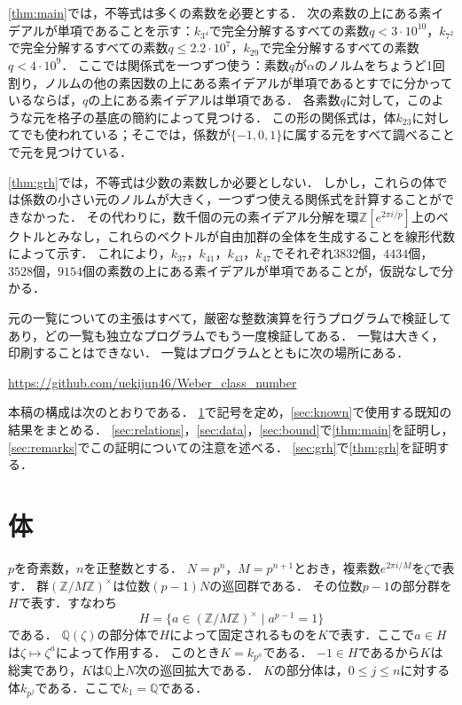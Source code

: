 \documentclass[11pt,a4paper]{ltjsarticle}
\theoremstyle{ja}
\begin{document}
\cref{thm:main}では，不等式は多くの素数を必要とする．
次の素数の上にある素イデアルが単項であることを示す：$k_{3^4}$で完全分解するすべての素数$q < 3 \cdot 10^{10}$，$k_{7^2}$で完全分解するすべての素数$q \le 2.2 \cdot 10^7$，$k_{29}$で完全分解するすべての素数$q < 4 \cdot 10^9$．
ここでは関係式を一つずつ使う：素数$q$が$\alpha$のノルムをちょうど1回割り，ノルムの他の素因数の上にある素イデアルが単項であるとすでに分かっているならば，$q$の上にある素イデアルは単項である．
各素数$q$に対して，このような元を格子の基底の簡約によって見つける．
この形の関係式は，体$k_{23}$に対して\cite{Ch26}でも使われている；そこでは，係数が$\{-1, 0, 1\}$に属する元をすべて調べることで元を見つけている．

\cref{thm:grh}では，不等式は少数の素数しか必要としない．
しかし，これらの体では係数の小さい元のノルムが大きく，一つずつ使える関係式を計算することができなかった．
その代わりに，数千個の元の素イデアル分解を環$\mathbb{Z}[e^{2\pi i/p}]$上のベクトルとみなし，これらのベクトルが自由加群の全体を生成することを線形代数によって示す．
これにより，$k_{37}$，$k_{41}$，$k_{43}$，$k_{47}$でそれぞれ$3832$個，$4434$個，$3528$個，$9154$個の素数の上にある素イデアルが単項であることが，仮説なしで分かる．

元の一覧についての主張はすべて，厳密な整数演算を行うプログラムで検証してあり，どの一覧も独立なプログラムでもう一度検証してある．
一覧は大きく，印刷することはできない．
一覧はプログラムとともに次の場所にある．
\begin{center}
\url{https://github.com/uekijun46/Weber_class_number}
\end{center}

本稿の構成は次のとおりである．
\cref{sec:field}で記号を定め，\cref{sec:known}で使用する既知の結果をまとめる．
\cref{sec:relations}，\cref{sec:data}，\cref{sec:bound}で\cref{thm:main}を証明し，\cref{sec:remarks}でこの証明についての注意を述べる．
\cref{sec:grh}で\cref{thm:grh}を証明する．

\section{体} \label{sec:field}

$p$を奇素数，$n$を正整数とする．
$N = p^n$，$M = p^{n+1}$とおき，複素数$e^{2\pi i/M}$を$\zeta$で表す．
群$(\mathbb{Z}/M\mathbb{Z})^\times$は位数$(p-1)N$の巡回群である．
その位数$p - 1$の部分群を$H$で表す．すなわち
\[
H = \{a \in (\mathbb{Z}/M\mathbb{Z})^\times \mid a^{p-1} = 1\}
\]
である．
$\mathbb{Q}(\zeta)$の部分体で$H$によって固定されるものを$K$で表す．ここで$a \in H$は$\zeta \mapsto \zeta^a$によって作用する．
このとき$K = k_{p^n}$である．
$-1 \in H$であるから$K$は総実であり，$K$は$\mathbb{Q}$上$N$次の巡回拡大である．
$K$の部分体は，$0 \le j \le n$に対する体$k_{p^j}$である．ここで$k_1 = \mathbb{Q}$である．
\end{document}
